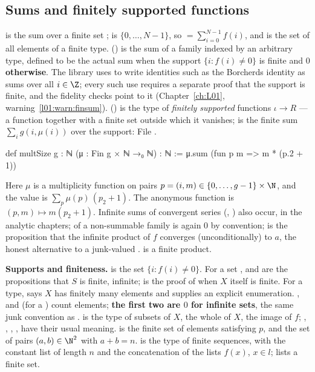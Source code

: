 \subsection{Sums and finitely supported functions}\label{ch01:sec:sums}

 is the sum over a finite set ;  is
$\{0,\dots,N-1\}$, so  $=\sum_{i=0}^{N-1}f(i)$, and
 is the set of all elements of a finite type.  () is
the sum of a family indexed by an arbitrary type, defined to be the actual sum when the support
$\{i : f(i)\ne0\}$ is finite and \textbf{$0$ otherwise}. The library uses  to write
identities such as the Borcherds identity as sums over all $i\in\Z$; every such use requires a
separate proof that the support is finite, and the fidelity checks point to it (Chapter~\ref{ch:L01},
warning~\ref{l01:warn:finsum}).  () is the type of \emph{finitely
supported} functions $\iota\to R$ --- a function together with a finite set outside which it
vanishes;  is the finite sum $\sum_{i}g(i,\mu(i))$ over the support:
\noindent File .
\begin{leancode}
def multSize {g : ℕ} (μ : Fin g × ℕ →₀ ℕ) : ℕ := μ.sum (fun p m => m * (p.2 + 1))
\end{leancode}
Here $\mu$ is a multiplicity function on pairs $p = (i,m)\in\{0,\dots,g-1\}\times\N$, and the value is
$\sum_p\mu(p)\,(p_2+1)$. The anonymous function  is $(p,m)\mapsto m(p_2+1)$.
Infinite sums of convergent series (, ) also occur, in the analytic chapters;
 of a non-summable family is again $0$ by convention;  is the proposition that
the infinite product of $f$ converges (unconditionally) to $a$, the honest alternative to a junk-valued
.  is a finite product.

\textbf{Supports and finiteness.}  is the set $\{i : f(i)\ne0\}$. For a set
,  and  are the propositions that $S$ is finite,
infinite;  is the proof of  when $X$ itself is finite. For a type,
 says $X$ has finitely many elements and  supplies an explicit
enumeration. ,  and  (for a ) count
elements; \textbf{the first two are $0$ for infinite sets}, the same junk convention as
.  is the type of subsets of $X$,  the whole of $X$,
 the image of $f$; , , , ,  have their usual
meaning.  is the finite set of elements satisfying $p$, and
 the set of pairs $(a,b)\in\N^2$ with $a+b = n$.  is the type
of finite sequences, with  the constant list of length $n$ and
 the concatenation of the lists $f(x)$, $x\in l$;  lists a finite set.

